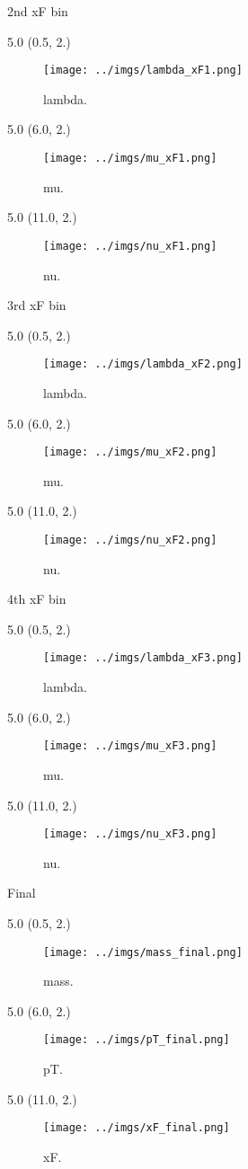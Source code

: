 \documentclass[12pt, xcolor={dvipsnames}, aspectratio = 169, sans,mathserif]{beamer}
\newenvironment{Pic}[2]
{
\begin{textblock}{#1} #2
\begin{figure}
}
{
\end{figure}
\end{textblock}
}
\begin{document}
%
%
%
\begin{frame}{2nd xF bin}
\begin{Pic}{5.0}{(0.5, 2.)}
  \texttt{[image: ../imgs/lambda\_xF1.png]}
  \caption{lambda.}
\end{Pic}

\begin{Pic}{5.0}{(6.0, 2.)}
  \texttt{[image: ../imgs/mu\_xF1.png]}
  \caption{mu.}
\end{Pic}

\begin{Pic}{5.0}{(11.0, 2.)}
  \texttt{[image: ../imgs/nu\_xF1.png]}
  \caption{nu.}
\end{Pic}
\end{frame}

%
%
%
\begin{frame}{3rd xF bin}
\begin{Pic}{5.0}{(0.5, 2.)}
  \texttt{[image: ../imgs/lambda\_xF2.png]}
  \caption{lambda.}
\end{Pic}

\begin{Pic}{5.0}{(6.0, 2.)}
  \texttt{[image: ../imgs/mu\_xF2.png]}
  \caption{mu.}
\end{Pic}

\begin{Pic}{5.0}{(11.0, 2.)}
  \texttt{[image: ../imgs/nu\_xF2.png]}
  \caption{nu.}
\end{Pic}
\end{frame}

%
%
%
\begin{frame}{4th xF bin}
\begin{Pic}{5.0}{(0.5, 2.)}
  \texttt{[image: ../imgs/lambda\_xF3.png]}
  \caption{lambda.}
\end{Pic}

\begin{Pic}{5.0}{(6.0, 2.)}
  \texttt{[image: ../imgs/mu\_xF3.png]}
  \caption{mu.}
\end{Pic}

\begin{Pic}{5.0}{(11.0, 2.)}
  \texttt{[image: ../imgs/nu\_xF3.png]}
  \caption{nu.}
\end{Pic}
\end{frame}

%
%
%
\begin{frame}{Final}
\begin{Pic}{5.0}{(0.5, 2.)}
  \texttt{[image: ../imgs/mass\_final.png]}
  \caption{mass.}
\end{Pic}

\begin{Pic}{5.0}{(6.0, 2.)}
  \texttt{[image: ../imgs/pT\_final.png]}
  \caption{pT.}
\end{Pic}

\begin{Pic}{5.0}{(11.0, 2.)}
  \texttt{[image: ../imgs/xF\_final.png]}
  \caption{xF.}
\end{Pic}
\end{frame}
\end{document}
